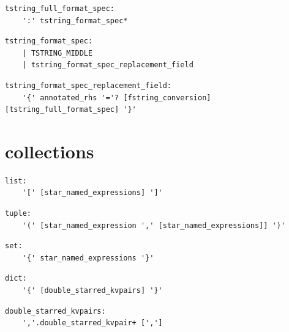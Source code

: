 \noindent\textbf{\texttt{}}\par
\begin{lstlisting}
tstring_full_format_spec:
    ':' tstring_format_spec*
\end{lstlisting}

\noindent\textbf{\texttt{}}\par
\begin{lstlisting}
tstring_format_spec:
    | TSTRING_MIDDLE
    | tstring_format_spec_replacement_field
\end{lstlisting}

\noindent\textbf{\texttt{}}\par
\begin{lstlisting}
tstring_format_spec_replacement_field:
    '{' annotated_rhs '='? [fstring_conversion] [tstring_full_format_spec] '}'
\end{lstlisting}

\section{collections}

\noindent\textbf{\texttt{}}\par
\begin{lstlisting}
list:
    '[' [star_named_expressions] ']'
\end{lstlisting}

\noindent\textbf{\texttt{}}\par
\begin{lstlisting}
tuple:
    '(' [star_named_expression ',' [star_named_expressions]] ')'
\end{lstlisting}

\noindent\textbf{\texttt{}}\par
\begin{lstlisting}
set:
    '{' star_named_expressions '}'
\end{lstlisting}

\noindent\textbf{\texttt{}}\par
\begin{lstlisting}
dict:
    '{' [double_starred_kvpairs] '}'
\end{lstlisting}

\noindent\textbf{\texttt{}}\par
\begin{lstlisting}
double_starred_kvpairs:
    ','.double_starred_kvpair+ [',']
\end{lstlisting}

